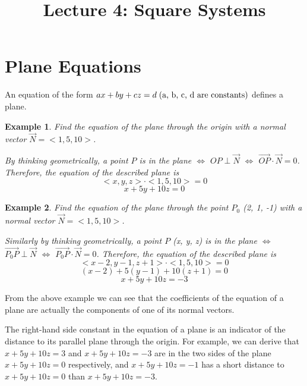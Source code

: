 \documentclass{article}
\title{Lecture 4: Square Systems}
\author{}
\date{}
\newtheorem{example}{Example}
\begin{document}
    
\maketitle

\section{Plane Equations}

An equation of the form 
$ax + by + cz = d \; \textnormal{(a, b, c, d are constants)}$ defines a plane.

\begin{example}
  Find the equation of the plane through the origin with a normal vector 
  $\vec{N} = <1, 5, 10>$.

  By thinking geometrically, a point $P$ is in the plane $\iff$ 
  $OP \perp \vec{N}$ $\iff$ $\vec{OP} \cdot \vec{N} = 0$. Therefore, the 
  equation of the described plane is
  \[
    <x, y, z> \cdot <1, 5, 10> = 0
  \]
  \[
    x + 5y + 10z = 0
  \]
\end{example}

\begin{example}
  Find the equation of the plane through the point $P_0$ (2, 1, -1) with a 
  normal vector $\vec{N} = <1, 5, 10>$.

  Similarly by thinking geometrically, a point $P$ (x, y, z) is in the plane 
  $\iff$ $\vec{P_0P} \perp \vec{N}$ $\iff$ $\vec{P_0P} \cdot \vec{N} = 0$. 
  Therefore, the equation of the described plane is 
  \[
    <x - 2, y - 1, z + 1> \cdot <1, 5, 10> = 0
  \]
  \[
    (x - 2) + 5(y - 1) + 10(z + 1) = 0
  \]
  \[
    x + 5y + 10z = -3
  \]
\end{example}

From the above example we can see that the coefficients of the equation of a 
plane are actually the components of one of its normal vectors.

The right-hand side constant in the equation of a plane is an indicator of the 
distance to its parallel plane through the origin. For example, we can derive 
that $x + 5y + 10z = 3$ and $x + 5y + 10z = -3$ are in the two sides of the 
plane $x + 5y + 10z = 0$ respectively, and $x + 5y + 10z = -1$ has a short 
distance to $x + 5y + 10z = 0$ than $x + 5y + 10z = -3$.
\end{document}
